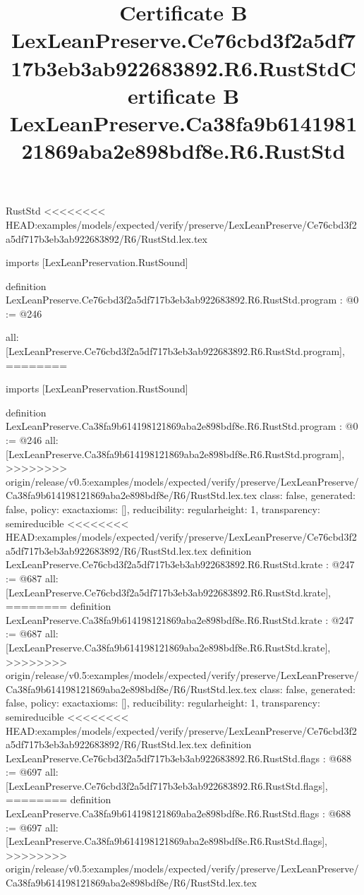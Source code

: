 \begin{lexlean}{RustStd}
<<<<<<<< HEAD:examples/models/expected/verify/preserve/LexLeanPreserve/Ce76cbd3f2a5df717b3eb3ab922683892/R6/RustStd.lex.tex
\title{Certificate B LexLeanPreserve.Ce76cbd3f2a5df717b3eb3ab922683892.R6.RustStd}
\begin{coremodule}
imports [LexLeanPreservation.RustSound]

definition LexLeanPreserve.Ce76cbd3f2a5df717b3eb3ab922683892.R6.RustStd.program : @0 := @246 {
  all: [LexLeanPreserve.Ce76cbd3f2a5df717b3eb3ab922683892.R6.RustStd.program],
========
\title{Certificate B LexLeanPreserve.Ca38fa9b614198121869aba2e898bdf8e.R6.RustStd}
\begin{coremodule}
imports [LexLeanPreservation.RustSound]

definition LexLeanPreserve.Ca38fa9b614198121869aba2e898bdf8e.R6.RustStd.program : @0 := @246 {
  all: [LexLeanPreserve.Ca38fa9b614198121869aba2e898bdf8e.R6.RustStd.program],
>>>>>>>> origin/release/v0.5:examples/models/expected/verify/preserve/LexLeanPreserve/Ca38fa9b614198121869aba2e898bdf8e/R6/RustStd.lex.tex
  class: false,
  generated: false,
  policy: exact{axioms: []},
  reducibility: regular{height: 1},
  transparency: semireducible
}
<<<<<<<< HEAD:examples/models/expected/verify/preserve/LexLeanPreserve/Ce76cbd3f2a5df717b3eb3ab922683892/R6/RustStd.lex.tex
definition LexLeanPreserve.Ce76cbd3f2a5df717b3eb3ab922683892.R6.RustStd.krate : @247 := @687 {
  all: [LexLeanPreserve.Ce76cbd3f2a5df717b3eb3ab922683892.R6.RustStd.krate],
========
definition LexLeanPreserve.Ca38fa9b614198121869aba2e898bdf8e.R6.RustStd.krate : @247 := @687 {
  all: [LexLeanPreserve.Ca38fa9b614198121869aba2e898bdf8e.R6.RustStd.krate],
>>>>>>>> origin/release/v0.5:examples/models/expected/verify/preserve/LexLeanPreserve/Ca38fa9b614198121869aba2e898bdf8e/R6/RustStd.lex.tex
  class: false,
  generated: false,
  policy: exact{axioms: []},
  reducibility: regular{height: 1},
  transparency: semireducible
}
<<<<<<<< HEAD:examples/models/expected/verify/preserve/LexLeanPreserve/Ce76cbd3f2a5df717b3eb3ab922683892/R6/RustStd.lex.tex
definition LexLeanPreserve.Ce76cbd3f2a5df717b3eb3ab922683892.R6.RustStd.flags : @688 := @697 {
  all: [LexLeanPreserve.Ce76cbd3f2a5df717b3eb3ab922683892.R6.RustStd.flags],
========
definition LexLeanPreserve.Ca38fa9b614198121869aba2e898bdf8e.R6.RustStd.flags : @688 := @697 {
  all: [LexLeanPreserve.Ca38fa9b614198121869aba2e898bdf8e.R6.RustStd.flags],
>>>>>>>> origin/release/v0.5:examples/models/expected/verify/preserve/LexLeanPreserve/Ca38fa9b614198121869aba2e898bdf8e/R6/RustStd.lex.tex
}}}
\end{coremodule}}
\end{coremodule}
\end{lexlean}
